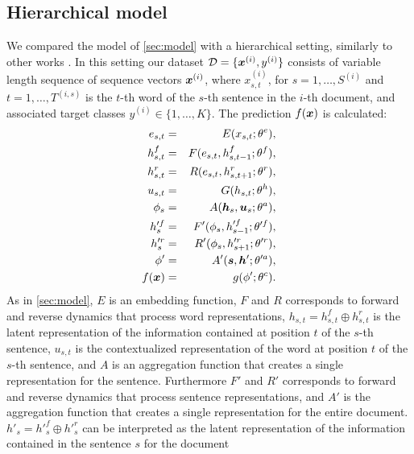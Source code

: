 \subsection{Hierarchical model}
\label{sec:modelh}
We compared the model of \cref{sec:model} with a hierarchical setting,
similarly to other works \cite{yang_hierarchical_2016}. In this
setting our dataset $\mathcal{D}=\{\bm{x}^{(i)},y^{(i)}\}$
consists of variable length sequence of sequence vectors
$\bm{x}^{(i)}$, where $x_{s,t}^{(i)}$, for $s=1,\dots,S^{(i)}$ and
$t=1,\dots,T^{(i,s)}$ is the $t$-th word of the $s$-th sentence in the
$i$-th document, and associated target classes
$y^{(i)}\in\{1,\dots,K\}$. The prediction $f(\bm{x})$ is calculated:
\begin{align}
  e_{s,t} &=& E(x_{s,t};\theta^e),\label{eq:embedH}\\
  h^f_{s,t} &=& F(e_{s,t},h^f_{s,t-1};\theta^{f}),\label{eq:maxModelRLH}\\  
  h^r_{s,t} &=& R(e_{s,t},h^r_{s,t+1};\theta^{r}),\label{eq:maxModelRRH}\\
  u_{s,t} &=& G(h_{s,t};\theta^{h}),\label{eq:maxModelFH}\\
  \phi_s & =& A(\bm{h}_s,\bm{u}_s;\theta^{a}),\label{eq:aggregationH}\\
  h'^{f}_{s} &=& F'(\phi_{s},h'^{f}_{s-1};\theta'^{f}),\label{eq:maxModelRLHS}\\  
  h'^{r}_{s} &=& R'(\phi_{s},h'^{r}_{s+1};\theta'^{r}),\label{eq:maxModelRRHS}\\
  \phi' & =& A'(\bm{s},\bm{h}';\theta'^{a}),\label{eq:aggregationHS}\\
  f(\bm{x}) &=& g(\phi';\theta^c).\label{eq:maxModelCH}
\end{align}
As in \cref{sec:model}, $E$ is an embedding function, $F$ and $R$
corresponds to forward and reverse dynamics that process word
representations,
$h_{s,t}=h_{s,t}^f\oplus h_{s,t}^r$ is the latent representation of
the information contained at position $t$ of the $s$-th sentence,
$u_{s,t}$ is the contextualized representation of the word at position
$t$ of the $s$-th sentence, and $A$ is an aggregation function that
creates a single representation for the sentence. Furthermore $F'$ and
$R'$ corresponds to 
forward and reverse dynamics that process sentence representations,
and $A'$ is the aggregation function that creates a single
representation for the entire document. $h'_s=h'^f_s\oplus h'^r_s$
can be interpreted as the
latent representation of the information contained in the sentence $s$
for the document

